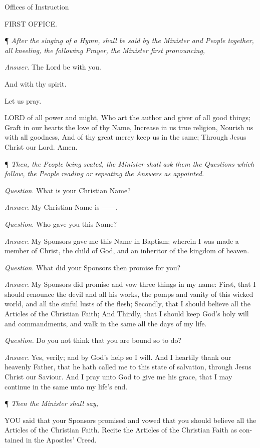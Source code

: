 Offices
of Instruction

FIRST OFFICE.

¶ \emph{After the singing of a Hymn, shall be said by the Minister
and People together, all kneeling, the following Prayer, the Minister
first pronouncing,}

\emph{Answer.} The Lord be with
you. 

And with thy spirit.

Let us
pray.

LORD
of all power and might, Who art the author and giver of all good things;
Graft in our hearts the love of thy Name, Increase in us true religion,
Nourish us with all goodness, And of thy great mercy keep us in the same;
Through Jesus Christ our Lord. Amen.

¶
\emph{Then, the People being seated, the Minister shall ask them the Questions
which follow, the People reading or repeating the Answers as appointed.}

\emph{Question}. What is your Christian Name? 

\emph{Answer}. My Christian Name is ——.

\emph{Question}. Who gave you this Name? 

\emph{Answer}. My Sponsors gave me this Name in Baptism;
wherein I was made a member of Christ, the child of God, and an inheritor
of the kingdom of heaven.

\emph{Question}. What did your Sponsors then promise
for you?

\emph{Answer}. My Sponsors did promise and vow three
things in my name: First, that I should renounce the devil and all his
works, the pomps and vanity of this wicked world, and all the sinful lusts
of the flesh; Secondly, that I should believe all the Articles of the
Christian Faith; And Thirdly, that I should keep God’s holy will
and commandments, and walk in the same all the days of my life.

\emph{Question.} Do you not think that you are bound
so to do? 

\emph{Answer}. Yes, verily; and by God's help so
I will. And I heartily thank our heavenly Father, that he hath called
me to this state of salvation, through Jesus Christ our Saviour. And I
pray unto God to give me his grace, that I may continue in the same unto
my life’s end.

¶
\emph{Then the Minister shall say,}

YOU
said that your Sponsors promised and vowed that you should believe all
the Articles of the Christian Faith. Recite the Articles of the Christian
Faith as con-tained in the Apostles’ Creed.

